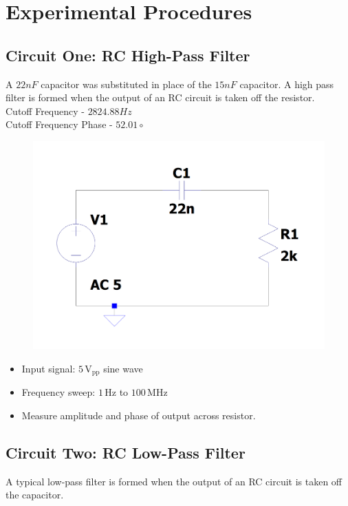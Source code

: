 \documentclass[12pt]{article}
\begin{document}
\section{Experimental Procedures}
\subsection{Circuit One: RC High-Pass Filter}
A $22nF$ capacitor was substituted in place of the $15nF$ capacitor.
A high pass filter is formed when the output of an RC circuit is taken off the
resistor. \\

Cutoff Frequency - $2824.88Hz$\\
Cutoff Frequency Phase - $52.01\circ$\\
\begin{figure}[H]
	\includegraphics[width=\textwidth]{e6_01}
\end{figure}

\begin{itemize}
	\item Input signal: $5\,\mathrm{V_{pp}}$ sine wave
	\item Frequency sweep: $1\,\mathrm{Hz}$ to $100\,\mathrm{MHz}$
	\item Measure amplitude and phase of output across resistor.
\end{itemize}

\subsection{Circuit Two: RC Low-Pass Filter}
A typical low-pass filter is formed when the output of an RC circuit is taken
off the capacitor.\\
\end{document}
